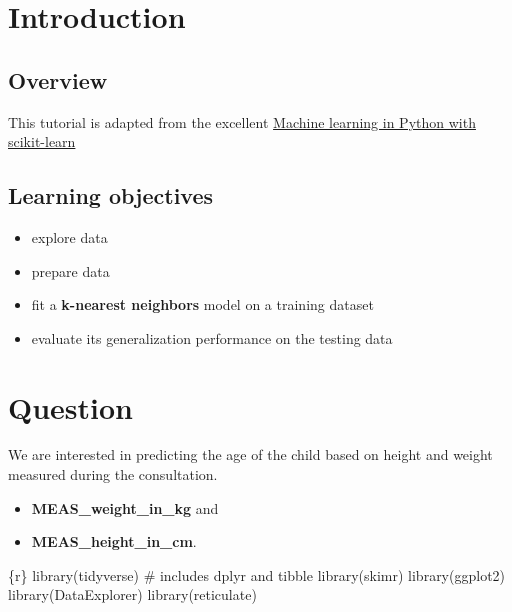 \documentclass[
  letterpaper,
  DIV=11,
  numbers=noendperiod,
  oneside]{scrreprt}
\newenvironment{Shaded}{\begin{snugshade}}{\end{snugshade}}
\newcommand{\CommentTok}[1]{\textcolor[rgb]{0.37,0.37,0.37}{#1}}
\newcommand{\FunctionTok}[1]{\textcolor[rgb]{0.28,0.35,0.67}{#1}}
\newcommand{\InformationTok}[1]{\textcolor[rgb]{0.37,0.37,0.37}{#1}}
\newcommand{\NormalTok}[1]{\textcolor[rgb]{0.00,0.23,0.31}{#1}}
\providecommand{\tightlist}{%
  \setlength{\itemsep}{0pt}\setlength{\parskip}{0pt}}\usepackage{longtable,booktabs,array}
\begin{document}
\hypertarget{introduction-16}{%
\section{Introduction}\label{introduction-16}}

\hypertarget{overview-9}{%
\subsection{Overview}\label{overview-9}}

This tutorial is adapted from the excellent
\href{https://www.fun-mooc.fr/en/courses/machine-learning-python-scikit-learn/}{Machine
learning in Python with scikit-learn}

\hypertarget{learning-objectives-10}{%
\subsection{Learning objectives}\label{learning-objectives-10}}

\begin{itemize}
\tightlist
\item
  explore data
\item
  prepare data
\item
  fit a \textbf{k-nearest neighbors} model on a training dataset
\item
  evaluate its generalization performance on the testing data
\end{itemize}

\hypertarget{question}{%
\section{Question}\label{question}}

We are interested in predicting the age of the child based on height and
weight measured during the consultation.

\begin{itemize}
\tightlist
\item
  \textbf{MEAS\_weight\_in\_kg} and
\item
  \textbf{MEAS\_height\_in\_cm}.
\end{itemize}

\begin{Shaded}
\begin{Highlighting}[]
\InformationTok{\textasciigrave{}\textasciigrave{}\textasciigrave{}\{r\}}
\FunctionTok{library}\NormalTok{(tidyverse) }\CommentTok{\# includes dplyr and tibble}
\FunctionTok{library}\NormalTok{(skimr)}
\FunctionTok{library}\NormalTok{(ggplot2)}
\FunctionTok{library}\NormalTok{(DataExplorer)}
\FunctionTok{library}\NormalTok{(reticulate)}
\InformationTok{\textasciigrave{}\textasciigrave{}\textasciigrave{}}
\end{Highlighting}
\end{Shaded}
\end{document}

